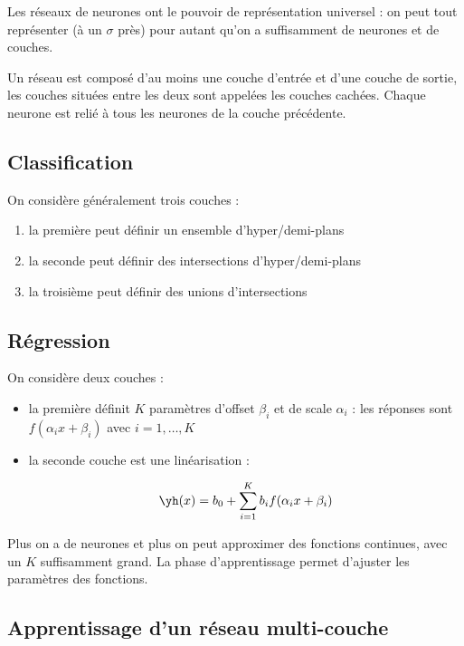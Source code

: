 Les réseaux de neurones ont le pouvoir de représentation universel : on peut tout représenter (à un $\sigma$ près) pour autant qu'on a suffisamment de neurones et de couches.

Un réseau est composé d'au moins une couche d'entrée et d'une couche de sortie, les couches situées entre les deux sont appelées les couches cachées. Chaque neurone est relié à tous les neurones de la couche précédente.

	\subsection{Classification}
	
	On considère généralement trois couches :
	
	\begin{enumerate}
		\item la première peut définir un ensemble d'hyper/demi-plans
		\item la seconde peut définir des intersections d'hyper/demi-plans
		\item la troisième peut définir des unions d'intersections
	\end{enumerate}
	
	
	\subsection{Régression}
	
	On considère deux couches :
	
	\begin{itemize}
		\item la première définit $K$ paramètres d'offset $\beta_i$ et de scale $\alpha_i$ : les réponses sont $f(\alpha_i x + \beta_i)$ avec $i = 1, \dots , K$
		\item la seconde couche est une linéarisation :
		
		$$\yh(x) = b_0 + \sum_{i = 1}^K b_i f(\alpha_i x + \beta_i)$$
	\end{itemize}
	
	
	Plus on a de neurones et plus on peut approximer des fonctions continues, avec un $K$ suffisamment grand. La phase d'apprentissage permet d'ajuster les paramètres des fonctions.
	
	\subsection{Apprentissage d'un réseau multi-couche}
	
